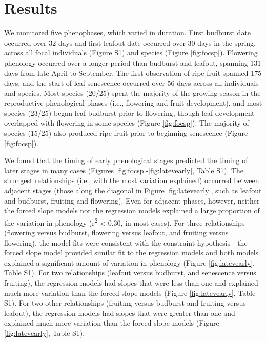 \documentclass{article}
\begin{document}
\section* {Results}
\par We monitored five phenophases, which varied in duration. First budburst date occurred over 32 days and first leafout date occurred over 30 days in the spring, across all focal individuals (Figure S1) and species (Figure \ref{fig:focsp}). Flowering phenology occurred over a longer period than budburst and leafout, spanning 131 days from late April to September. The first observation of ripe fruit spanned 175 days, and the start of leaf senescence occurred over 56 days across all individuals and species. Most species (20/25) spent the majority of the growing season in the reproductive phenological phases (i.e., flowering and fruit development), and most species (23/25) began leaf budburst prior to flowering, though leaf development overlapped with flowering in some species (Figure \ref{fig:focsp}). The majority of species (15/25) also produced ripe fruit prior to beginning senescence (Figure \ref{fig:focsp}).

\par We found that the timing of early phenological stages predicted the timing of later stages in many cases (Figures \ref{fig:focsp}-\ref{fig:latevearly}, Table S1). The strongest relationships (i.e., with the most variation explained) occurred between adjacent stages (those along the diagonal in Figure \ref{fig:latevearly}, such as leafout and budburst, fruiting and flowering). Even for adjacent phases, however, neither the forced slope models nor the regression models explained a large proportion of the variation in phenology (r\textsuperscript{2} < 0.30, in most cases). For three relationships (flowering versus budburst, flowering versus leafout, and fruiting versus flowering), the model fits were consistent with the constraint hypothesis---the forced slope model provided similar fit to the regression models and both models explained a significant amount of variation in phenology (Figure \ref{fig:latevearly}, Table S1). For two relationships (leafout versus budburst, and senescence versus fruiting), the regression models had slopes that were less than one and explained much more variation than the forced slope models (Figure \ref{fig:latevearly}, Table S1). For two other relationships (fruiting versus budburst and fruiting versus leafout), the regression models had slopes that were greater than one and explained much more variation than the forced slope models (Figure \ref{fig:latevearly}, Table S1).
\end{document}
